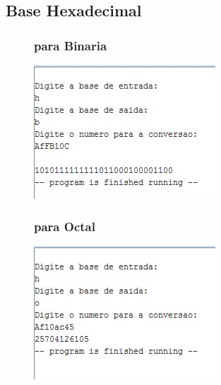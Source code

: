 \documentclass[10pt,a4paper]{article}
\begin{document}
\subsection{Base Hexadecimal}
\begin{figure}[H]
\begin{minipage}[t]{.5\textwidth}
\subsubsection{para Binaria}
\includegraphics[width=\textwidth]{HB.jpg}
\end{minipage}
\begin{minipage}[t]{.5\textwidth}
\subsubsection{para Octal}
\includegraphics[width=\textwidth]{HO.jpg}
\end{minipage}
\begin{minipage}[t]{.5\textwidth}

\end{minipage}
\end{figure}
\end{document}
